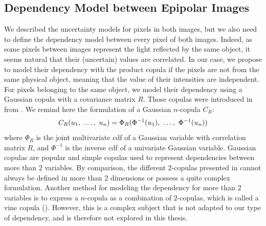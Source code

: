 \subsection{Dependency Model between Epipolar Images}
We described the uncertainty models for pixels in both images, but we also need to define the dependency model between every pixel of both images. Indeed, as some pixels between images represent the light reflected by the same object, it seems natural that their (uncertain) values are correlated. In our case, we propose to model their dependency with the product copula if the pixels are not from the same physical object, meaning that the value of their intensities are independent. For pixels belonging to the same object, we model their dependency using a Gaussian copula with a covariance matrix $R$. Those copulas were introduced in  from . We remind here the formulation of a Gaussian $n$-copula $C_R$:
\begin{align}
    C_R(u_1 , ~\ldots, ~ u_n)=\Phi_R(\Phi^{-1}(u_1) , ~\ldots, ~ \Phi^{-1}(u_n))\label{eq:gaussian_copula}
\end{align} where $\Phi_R$ is the joint multivariate \acrfull{cdf} of a Gaussian variable with correlation matrix $R$, and $\Phi^{-1}$ is the inverse \acrshort{cdf} of a univariate Gaussian variable. Gaussian copulas are popular and simple copulas used to represent dependencies between more than $2$ variables. By comparison, the different $2$-copulas presented in  cannot always be defined in more than $2$ dimensions or possess a quite complex formulation. Another method for modeling the dependency for more than $2$ variables is to express a $n$-copula as a combination of $2$-copulas, which is called a vine copula (\cite{czado_vine_2022}). However, this is a complex subject that is not adapted to our type of dependency, and is therefore not explored in this thesis.

